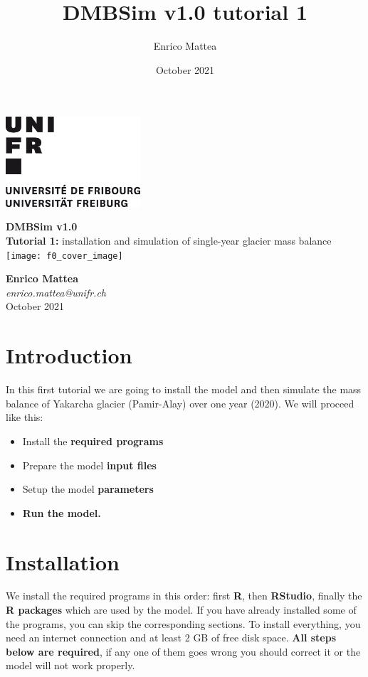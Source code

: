\documentclass[15pt]{extarticle}
\title{DMBSim v1.0 tutorial 1}
\author{Enrico Mattea}
\date{October 2021}
\begin{document}

\begin{titlepage}
    \includegraphics[width=5cm]{unifr_logo}
    \par
    \vspace{2.0cm}
	\centering
	{\huge\textbf{DMBSim v1.0\\}}
	\vspace{0.3 cm}
	{\large \textbf{Tutorial 1:} installation and simulation of single-year glacier mass balance\\}
	\vspace{2.4 cm}
	\texttt{[image: f0\_cover\_image]}\par
	\vspace{2.1 cm}
	{\normalsize \textbf{Enrico Mattea}\\}
	{\normalsize \textit{enrico.mattea@unifr.ch\\}}
	\vspace{0.6 cm}
	{\normalsize October 2021}


	\vfill

\end{titlepage}


\section{Introduction}
In this first tutorial we are going to install the model and then simulate the mass balance of Yakarcha glacier (Pamir-Alay) over one year (2020).
We will proceed like this:
\begin{itemize}
    \item Install the \textbf{required programs}
    \item Prepare the model \textbf{input files}
    \item Setup the model \textbf{parameters}
    \item \textbf{Run the model.}
\end{itemize}

\clearpage
\section{Installation}
We install the required programs in this order: first \textbf{R}, then \textbf{RStudio}, finally the \textbf{R packages} which are used by the model. If you have already installed some of the programs, you can skip the corresponding sections.
To install everything, you need an internet connection and at least 2 GB of free disk space. \textbf{All steps below are required}, if any one of them goes wrong you should correct it or the model will not work properly.
\end{document}
